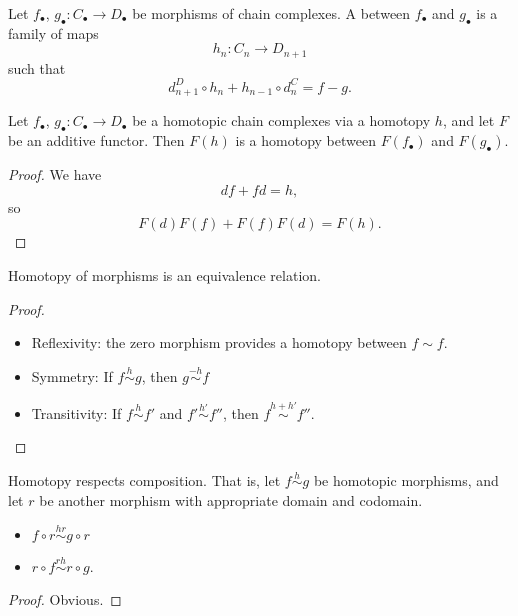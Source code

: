 \documentclass[main.tex]{subfiles}
\begin{document}
\begin{definition}
  \label{def:chain_homotopy}
  Let $f_{\bullet}$, $g_{\bullet}\colon C_{\bullet} \to D_{\bullet}$ be morphisms of chain complexes. A  between $f_{\bullet}$ and $g_{\bullet}$ is a family of maps
  \begin{equation*}
    h_{n}\colon C_{n} \to D_{n+1}
  \end{equation*}
  such that
  \begin{equation*}
    d^{D}_{n+1} \circ h_{n} + h_{n-1} \circ d^{C}_{n} = f - g.
  \end{equation*}
\end{definition}

\begin{lemma}
  \label{lemma:additive_functors_preserve_homotopy}
  Let $f_{\bullet}$, $g_{\bullet}\colon C_{\bullet} \to D_{\bullet}$ be a homotopic chain complexes via a homotopy $h$, and let $F$ be an additive functor. Then $F(h)$ is a homotopy between $F(f_{\bullet})$ and $F(g_{\bullet})$.
\end{lemma}
\begin{proof}
  We have
  \begin{equation*}
    df + fd = h,
  \end{equation*}
  so
  \begin{equation*}
    F(d)F(f) + F(f)F(d) = F(h).
  \end{equation*}
\end{proof}

\begin{lemma}
  \label{lemma:homotopy_equivalence_relation}
  Homotopy of morphisms is an equivalence relation.
\end{lemma}
\begin{proof}
  \leavevmode
  \begin{itemize}
    \item Reflexivity: the zero morphism provides a homotopy between $f \sim f$.

    \item Symmetry: If $f \overset{h}{\sim} g$, then $g \overset{-h}{\sim} f$

    \item Transitivity: If $f \overset{h}{\sim} f'$ and $f' \overset{h'}{\sim} f''$, then $f \overset{h + h'}{\sim} f''$.
  \end{itemize}
\end{proof}

\begin{lemma}
  \label{lemma:homotopy_respects_composition}
  Homotopy respects composition. That is, let $f \overset{h}{\sim} g$ be homotopic morphisms, and let $r$ be another morphism with appropriate domain and codomain.
  \begin{itemize}
    \item $f \circ r \overset{hr}{\sim} g \circ r$

    \item $r \circ f \overset{rh}{\sim} r \circ g$.
  \end{itemize}
\end{lemma}
\begin{proof}
  Obvious.
\end{proof}
\end{document}
